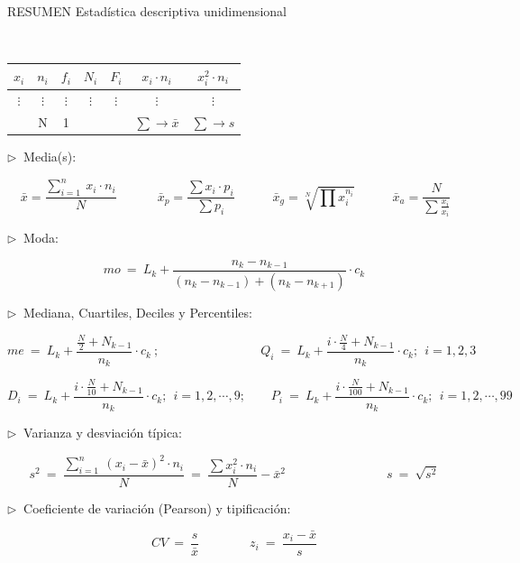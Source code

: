 \newpage

$\quad$

$\quad$



\begin{myblock}{RESUMEN Estadística descriptiva unidimensional}

$ \quad $

\begin{table}[H]
\centering
\begin{tabular}{c|c|c|c|c|c|c}
\hline
\multicolumn{1}{|c|}{$x_i$} & $n_i$ & $f_i$ & $N_i$ & $F_i$ & $x_i \cdot n_i$ & \multicolumn{1}{c|}{$x_i^2 \cdot n_i$} \\ \hline
\multicolumn{1}{|c|}{$\vdots$} & $\vdots$ & $\vdots$ & $\vdots$ & $\vdots$ & $\vdots$ & \multicolumn{1}{c|}{$\vdots$} \\ \hline
 & N & 1 &  &  & $\sum \to \bar x$ & $\sum \to s$
 
\end{tabular}
\end{table}
	
 $\triangleright \ $ Media(s):
  
 $$ \boxed{\ \bar x=\dfrac{\displaystyle \sum_{i=1}^n \ x_i \cdot n_i}{N} \ }
 \qquad  \quad
 \bar x_p=\dfrac{\sum x_i \cdot p_i}{\sum p_i} 
 \qquad \quad
 \bar x_g=\sqrt[N]{\prod x_i ^{n_i} } 
 \qquad \quad
 \bar x_a= \dfrac{N}{\sum \frac{x_i}{x_i}}$$
 
 \vspace{5mm} $\triangleright \ $ Moda:
 
 $$ mo\ = \ L_k + \dfrac{n_k-n_{k-1}}{(n_k-n_{k-1})+(n_k-n_{k+1})} \cdot c_k$$
 
 \vspace{5mm}  $\triangleright \ $ Mediana, Cuartiles, Deciles y Percentiles:
 
 $$me \ = \ L_k+\dfrac{ \frac N 2 + N_{k-1}}{n_k}\cdot c_k\ ; 
 \qquad  \qquad \qquad \qquad
 Q_i \ = \ L_k+\dfrac{i\cdot \frac N 4 + N_{k-1}}{n_k}\cdot c_k ;	\ \ i=1,2,3$$
 
 $$D_i \ = \ L_k+\dfrac{i\cdot \frac N {10} + N_{k-1}}{n_k}\cdot c_k ;	\ \ i=1,2,\cdots , 9 ; \qquad 
 P_i \ = \ L_k+\dfrac{i\cdot \frac N {100} + N_{k-1}}{n_k}\cdot c_k ;	\ \ i=1,2,\cdots , 99 $$
  
\vspace{5mm}  $\triangleright \ $ Varianza y desviación típica: 

$$ s^2 \ = \ \dfrac{\displaystyle \sum_{i=1}^n\ (x_i-\bar x)^2\cdot n_i}{N} \ = \ \dfrac{\sum x_i^2\cdot n_i}{N} - \bar x^2
\qquad \qquad \qquad \qquad 
s \ = \ \sqrt{s^2} $$

\vspace{5mm}  $\triangleright \ $ Coeficiente de variación (Pearson) y tipificación: 

$$ CV \ = \ \dfrac {s}{\bar x}
\qquad \qquad  
z_i \ = \ \dfrac {x_i-\bar x}{s}$$

$ \quad $

\end{myblock}

	